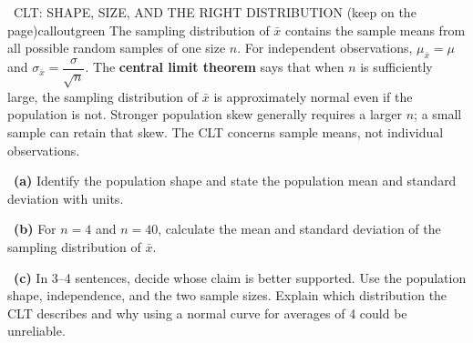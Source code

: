 \documentclass[11pt]{article}
\begin{document}
\begin{callout}{\IconBook\ CLT: SHAPE, SIZE, AND THE RIGHT DISTRIBUTION (keep on the page)}{calloutgreen}
The sampling distribution of $\bar{x}$ contains the sample means from all possible random samples of one size $n$.
For independent observations, $\mu_{\bar{x}}=\mu$ and $\sigma_{\bar{x}}=\dfrac{\sigma}{\sqrt{n}}$.
The \textbf{central limit theorem} says that when $n$ is sufficiently large, the sampling distribution of
$\bar{x}$ is approximately normal even if the population is not. Stronger population skew generally requires
a larger $n$; a small sample can retain that skew. The CLT concerns sample means, not individual observations.
\end{callout}

~\textbf{(a)} Identify the population shape and state the population mean and standard deviation with units.\par
{}

~\textbf{(b)} For $n=4$ and $n=40$, calculate the mean and standard deviation of the sampling distribution of $\bar{x}$.\par
{}

~\textbf{(c)} In 3--4 sentences, decide whose claim is better supported. Use the population shape, independence, and the two sample sizes. Explain which distribution the CLT describes and why using a normal curve for averages of 4 could be unreliable.\par
{}
\end{document}

